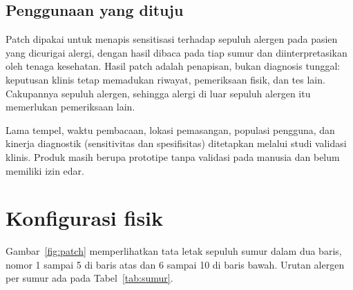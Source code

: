 \documentclass[11pt,a4paper]{article}
\begin{document}
\subsection{Penggunaan yang dituju}

Patch dipakai untuk menapis sensitisasi terhadap sepuluh alergen pada pasien yang dicurigai alergi, dengan hasil dibaca pada tiap sumur dan diinterpretasikan oleh tenaga kesehatan. Hasil patch adalah penapisan, bukan diagnosis tunggal: keputusan klinis tetap memadukan riwayat, pemeriksaan fisik, dan tes lain. Cakupannya sepuluh alergen, sehingga alergi di luar sepuluh alergen itu memerlukan pemeriksaan lain.

Lama tempel, waktu pembacaan, lokasi pemasangan, populasi pengguna, dan kinerja diagnostik (sensitivitas dan spesifisitas) ditetapkan melalui studi validasi klinis. Produk masih berupa prototipe tanpa validasi pada manusia dan belum memiliki izin edar.

\section{Konfigurasi fisik}

Gambar~\ref{fig:patch} memperlihatkan tata letak sepuluh sumur dalam dua baris, nomor 1 sampai 5 di baris atas dan 6 sampai 10 di baris bawah. Urutan alergen per sumur ada pada Tabel~\ref{tab:sumur}.
\end{document}
